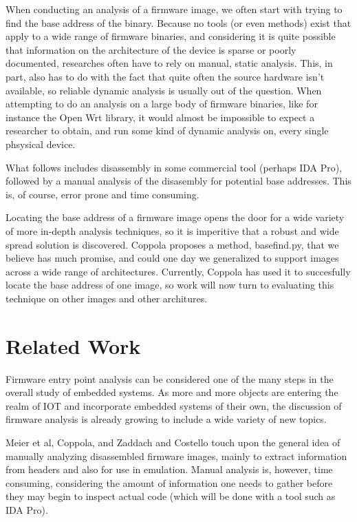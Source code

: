 \documentclass[letterpaper,twocolumn,10pt]{article}
\begin{document}
When conducting an analysis of a firmware image, we often start with trying to find the base address of the binary. Because no tools (or even methods) exist that apply to a wide range of firmware binaries, and considering it is quite possible that information on the architecture of the device is sparse or poorly documented, researches often have to rely on manual, static analysis. This, in part, also has to do with the fact that quite often the source hardware isn't available, so reliable dynamic analysis is usually out of the question. When attempting to do an analysis on a large body of firmware binaries, like for instance the Open Wrt library, it would almost be impossible to expect a researcher to obtain, and run some kind of dynamic analysis on, every single phsysical device.

What follows includes disassembly in some commercial tool (perhaps IDA Pro), followed by a manual analysis of the disasembly for potential base addresses. This is, of course, error prone and time consuming.

Locating the base address of a firmware image opens the door for a wide variety of more in-depth analysis techniques, so it is imperitive that a robust and wide spread solution is discovered. Coppola\cite{cloudscale2013} proposes a method, basefind.py, that we believe has much promise, and could one day we generalized to support images across a wide range of architectures. Currently, Coppola has used it to succesfully locate the base address of one image, so work will now turn to evaluating this technique on other images and other architures.

\section{Related Work}
Firmware entry point analysis can be considered one of the many steps in the overall study of embedded systems. As more and more objects are entering the realm of IOT and incorporate embedded systems of their own, the discussion of firmware analysis is already growing to include a wide variety of new topics. 

Meier et al\cite{fitnesstrackers2016}, Coppola\cite{cloudscale2013}, and Zaddach and Costello\cite{securityfirmwarereverse2013} touch upon the general idea of manually analyzing disassembled firmware images, mainly to extract information from headers and also for use in emulation. Manual analysis is, however, time consuming, considering the amount of information one needs to gather before they may begin to inspect actual code (which will be done with a tool such as IDA Pro). 
\end{document}
